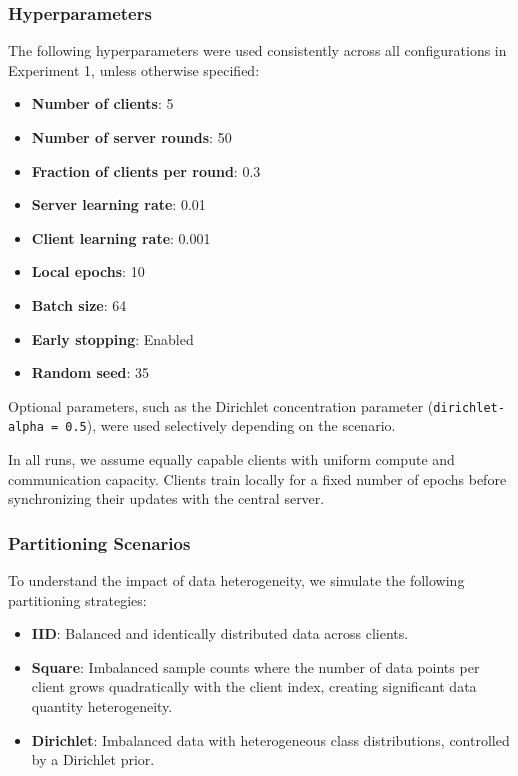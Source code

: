 \documentclass[11pt]{article}
\begin{document}
    \subsubsection{Hyperparameters}

    The following hyperparameters were used consistently across all configurations in Experiment 1, unless otherwise specified:

    \begin{itemize}
        \item \textbf{Number of clients}: 5
        \item \textbf{Number of server rounds}: 50
        \item \textbf{Fraction of clients per round}: 0.3
        \item \textbf{Server learning rate}: 0.01
        \item \textbf{Client learning rate}: 0.001
        \item \textbf{Local epochs}: 10
        \item \textbf{Batch size}: 64
        \item \textbf{Early stopping}: Enabled
        \item \textbf{Random seed}: 35
    \end{itemize}

    Optional parameters, such as the Dirichlet concentration parameter (\texttt{dirichlet-alpha = 0.5}), were used selectively depending on the scenario.

    In all runs, we assume equally capable clients with uniform compute and communication capacity. Clients train locally for a fixed number of epochs before synchronizing their updates with the central server.

    \subsubsection{Partitioning Scenarios}

    To understand the impact of data heterogeneity, we simulate the following partitioning strategies:

    \begin{itemize}
        \item \textbf{IID}: Balanced and identically distributed data across clients.
        \item \textbf{Square}: Imbalanced sample counts where the number of data points per client grows quadratically with the client index, creating significant data quantity heterogeneity.
        \item \textbf{Dirichlet}: Imbalanced data with heterogeneous class distributions, controlled by a Dirichlet prior.
    \end{itemize}
\end{document}
